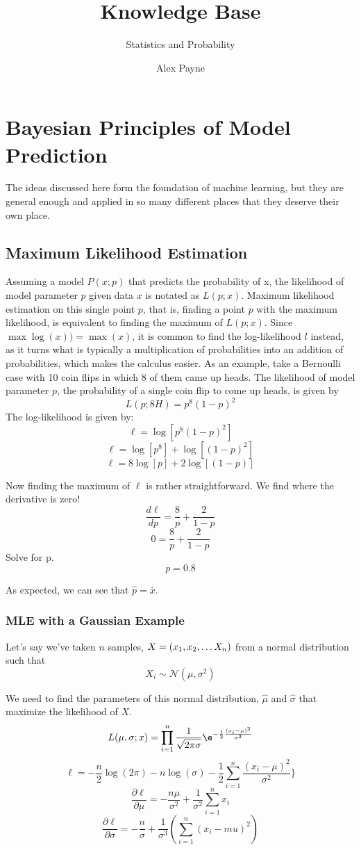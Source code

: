 \documentclass[english,course]{lecture}
\title{Knowledge Base}
\subtitle{Statistics and Probability}
\author{Alex Payne}
\begin{document}
\vfill
\eject

\section{Bayesian Principles of Model Prediction}

The ideas discussed here form the foundation of machine learning,
but they are general enough and applied in so many different places that they deserve their own place.

\subsection{Maximum Likelihood Estimation}

Assuming a model \(P(x; p)\) that predicts the probability of x, the likelihood of model parameter \(p\) given data \(x\) is notated as \(L(p; x)\).
Maximum likelihood estimation on this single point \(p\), that is, finding a point \(p\) with the maximum likelihood, is equivalent to finding the maximum of \(L(p; x)\).
Since \(\max\log(x)) = \max(x)\), it is common to find the log-likelihood \(l\) instead, as it turns what is typically a multiplication of probabilities into an addition of probabilities, which makes the calculus easier.
As an example, take a Bernoulli case with 10 coin flips in which 8 of them came up heads. The likelihood of model parameter \(p\), the probability of a single coin flip to come up heads, is given by
\[
    L(p; 8H) = p^8 (1 - p)^2
\]
The log-likelihood is given by:
\[\ell = \log[p^8 (1 - p)^2]\]
\[\ell = \log[p^8] + \log[(1 - p)^2]\]
\[\ell = 8\log[p] + 2\log[(1 - p)]\]

Now finding the maximum of \( \ell \) is rather straightforward. We find where the derivative is zero!
\[\frac{d \ell}{dp} = \frac{8}{p} + \frac{2}{1-p}\]
\[0 = \frac{8}{p} + \frac{2}{1-p}\]
Solve for p.
\[p = 0.8\]

As expected, we can see that \( \hat{p} = \bar{x} \).

\subsubsection{MLE with a Gaussian Example}
Let's say we've taken \(n\) samples, \(X = (x_1, x_2, \mathellipsis X_n)\) from a normal distribution such that
\[X_i \sim \mathcal{N}(\mu, \sigma^2)\]

We need to find the parameters of this normal distribution, \(\hat{\mu}\) and \(\hat{\sigma}\) that maximize the likelihood of \(X\).
\[L(\mu, \sigma ; x) = \prod_{i=1}^{n} \frac{1}{\sqrt{2 \pi \sigma}} \e^{-\frac{1}{2} \frac{(x_i - \mu)^2}{\sigma^2}}\]
\[\ell = -\frac{n}{2} \log(2 \pi) - n \log(\sigma) - \frac{1}{2}\sum_{i=1}^n \frac{(x_i - \mu)^2}{\sigma^2}\}\]
\[\frac{\partial \ell}{\partial \mu} = -\frac{n\mu}{\sigma^2} + \frac{1}{\sigma^2}\sum_{i=1}^n x_i\]
\[\frac{\partial \ell}{\partial \sigma} = -\frac{n}{\sigma} + \frac{1}{\sigma ^3}(\sum_{i=1}^n (x_i - mu)^2)\]
\end{document}
